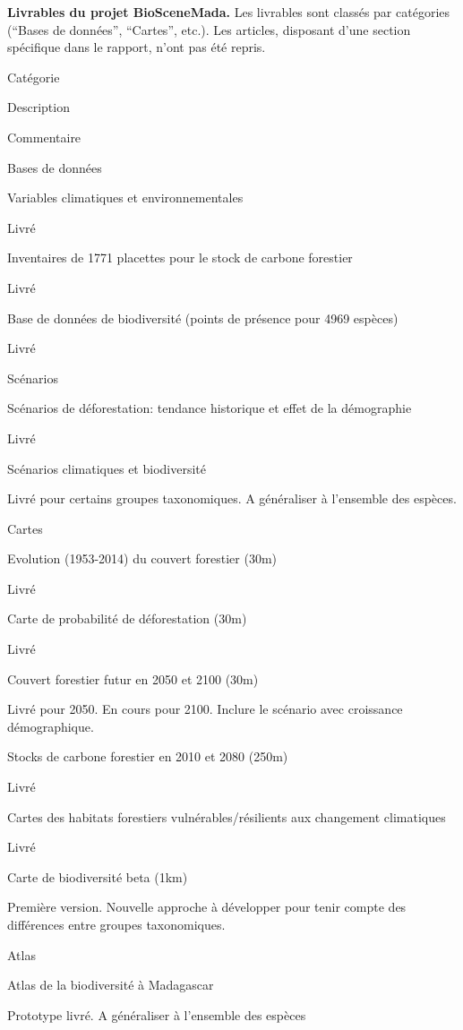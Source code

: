 \documentclass[12pt,]{article}
\begin{document}
\label{tab:livrables}\textbf{Livrables du projet BioSceneMada.} Les
livrables sont classés par catégories (``Bases de données'', ``Cartes'',
etc.). Les articles, disposant d'une section spécifique dans le rapport,
n'ont pas été repris.

Catégorie

Description

Commentaire

Bases de données

Variables climatiques et environnementales

Livré

Inventaires de 1771 placettes pour le stock de carbone forestier

Livré

Base de données de biodiversité (points de présence pour 4969 espèces)

Livré

Scénarios

Scénarios de déforestation: tendance historique et effet de la
démographie

Livré

Scénarios climatiques et biodiversité

Livré pour certains groupes taxonomiques. A généraliser à l'ensemble des
espèces.

Cartes

Evolution (1953-2014) du couvert forestier (30m)

Livré

Carte de probabilité de déforestation (30m)

Livré

Couvert forestier futur en 2050 et 2100 (30m)

Livré pour 2050. En cours pour 2100. Inclure le scénario avec croissance
démographique.

Stocks de carbone forestier en 2010 et 2080 (250m)

Livré

Cartes des habitats forestiers vulnérables/résilients aux changement
climatiques

Livré

Carte de biodiversité beta (1km)

Première version. Nouvelle approche à développer pour tenir compte des
différences entre groupes taxonomiques.

Atlas

Atlas de la biodiversité à Madagascar

Prototype livré. A généraliser à l'ensemble des espèces
\end{document}
